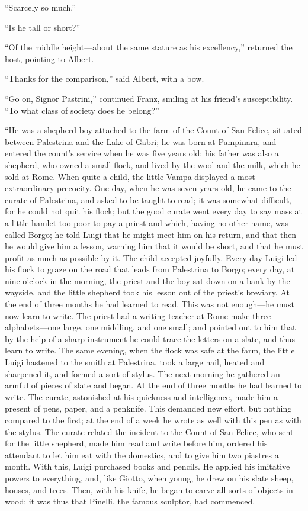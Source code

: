 “Scarcely so much.”

“Is he tall or short?”

“Of the middle height—about the same stature as his excellency,”
returned the host, pointing to Albert.

“Thanks for the comparison,” said Albert, with a bow.

“Go on, Signor Pastrini,” continued Franz, smiling at his friend’s
susceptibility. “To what class of society does he belong?”

“He was a shepherd-boy attached to the farm of the Count of San-Felice,
situated between Palestrina and the Lake of Gabri; he was born at
Pampinara, and entered the count’s service when he was five years old;
his father was also a shepherd, who owned a small flock, and lived by
the wool and the milk, which he sold at Rome. When quite a child, the
little Vampa displayed a most extraordinary precocity. One day, when he
was seven years old, he came to the curate of Palestrina, and asked to
be taught to read; it was somewhat difficult, for he could not quit his
flock; but the good curate went every day to say mass at a little
hamlet too poor to pay a priest and which, having no other name, was
called Borgo; he told Luigi that he might meet him on his return, and
that then he would give him a lesson, warning him that it would be
short, and that he must profit as much as possible by it. The child
accepted joyfully. Every day Luigi led his flock to graze on the road
that leads from Palestrina to Borgo; every day, at nine o’clock in the
morning, the priest and the boy sat down on a bank by the wayside, and
the little shepherd took his lesson out of the priest’s breviary. At
the end of three months he had learned to read. This was not enough—he
must now learn to write. The priest had a writing teacher at Rome make
three alphabets—one large, one middling, and one small; and pointed out
to him that by the help of a sharp instrument he could trace the
letters on a slate, and thus learn to write. The same evening, when the
flock was safe at the farm, the little Luigi hastened to the smith at
Palestrina, took a large nail, heated and sharpened it, and formed a
sort of stylus. The next morning he gathered an armful of pieces of
slate and began. At the end of three months he had learned to write.
The curate, astonished at his quickness and intelligence, made him a
present of pens, paper, and a penknife. This demanded new effort, but
nothing compared to the first; at the end of a week he wrote as well
with this pen as with the stylus. The curate related the incident to
the Count of San-Felice, who sent for the little shepherd, made him
read and write before him, ordered his attendant to let him eat with
the domestics, and to give him two piastres a month. With this, Luigi
purchased books and pencils. He applied his imitative powers to
everything, and, like Giotto, when young, he drew on his slate sheep,
houses, and trees. Then, with his knife, he began to carve all sorts of
objects in wood; it was thus that Pinelli, the famous sculptor, had
commenced.

